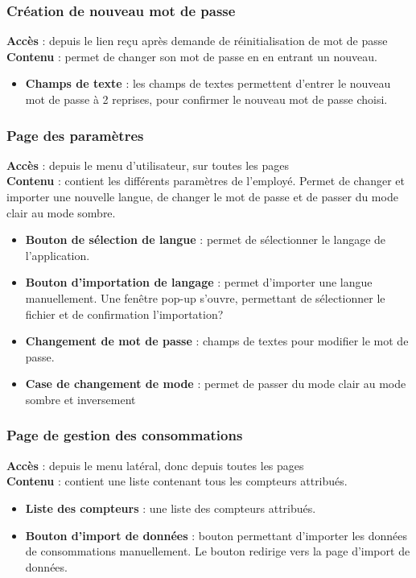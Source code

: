\documentclass[../rapport.tex]{subfiles}
\begin{document}
\subsubsection{Création de nouveau mot de passe}
\noindent \textbf{Accès} : depuis le lien reçu après demande de réinitialisation de mot de passe \\
\textbf{Contenu }: permet de changer son mot de passe en en entrant un nouveau.
\begin{itemize}
    \item \textbf{Champs de texte} : les champs de textes permettent d'entrer le nouveau mot de passe à 2 reprises, pour confirmer le nouveau mot de passe choisi.
\end{itemize}


\subsubsection{Page des paramètres}
\noindent \textbf{Accès} :  depuis le menu d'utilisateur, sur toutes les pages\\
\textbf{Contenu }: contient les différents paramètres de l'employé. Permet de changer et importer une nouvelle langue, de changer le mot de passe et de passer du mode clair au mode sombre.
\begin{itemize}
    \item \textbf{Bouton de sélection de langue} : permet de sélectionner le langage de l'application.
    \item \textbf{Bouton d'importation de langage} : permet d'importer une langue manuellement. Une fenêtre pop-up s'ouvre, permettant de sélectionner le fichier et de confirmation l'importation?
    \item \textbf{Changement de mot de passe} : champs de textes pour modifier le mot de passe.
    \item \textbf{Case de changement de mode} : permet de passer du mode clair au mode sombre et inversement
\end{itemize}

\subsubsection{Page de gestion des consommations}
\noindent \textbf{Accès} : depuis le menu latéral, donc depuis toutes les pages \\
\textbf{Contenu }: contient une liste contenant tous les compteurs attribués.
\begin{itemize}
    \item \textbf{Liste des compteurs} : une liste des compteurs attribués.
    \item \textbf{Bouton d'import de données} : bouton permettant d'importer les données de consommations manuellement. Le bouton redirige vers la page d'import de données.
\end{itemize}
\end{document}
